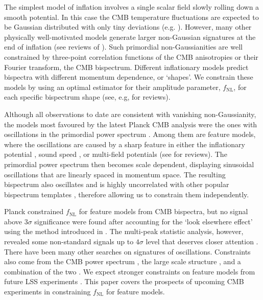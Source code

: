 The simplest model of inflation involves a single scalar field slowly rolling down a smooth potential. In this case the CMB temperature fluctuations are expected to be Gaussian distributed with only tiny deviations (e.g. \cite{Maldacena2013}). However, many other physically well-motivated models generate larger non-Gaussian signatures at the end of inflation (see reviews of \cite{Chen2010review}). Such primordial non-Gaussianities are well constrained by three-point correlation functions of the CMB anisotropies or their Fourier transform, the CMB bispectrum. Different inflationary models predict bispectra with different momentum dependence, or `shapes'. We constrain these models by using an optimal estimator for their amplitude parameter,  $f_\text{NL}$,  for each specific bispectrum shape (see, e.g, \cite{Komatsu2010,Liguori2010} for reviews).

Although all observations to date are consistent with vanishing non-Gaussianity, the models most favoured by the latest Planck CMB analysis were the ones with oscillations in the primordial power spectrum \cite{PlanckCollaboration2015}. Among them are feature models, where the oscillations are caused by a sharp feature in either the inflationary potential \cite{starobinsky1992,Adams2001,Chen2007,Adshead2012,Hazra2014,Dvorkin2010}, sound speed \cite{Miranda2012,Bartolo2013}, or multi-field potentials \cite{Achucarro2011} (see \cite{Chen2010review,Chluba2015} for reviews). The primordial power spectrum then becomes scale dependent, displaying sinusoidal oscillations that are linearly spaced in momentum space. The resulting bispectrum also oscillates and is highly uncorrelated with other popular bispectrum templates \cite{Meerburg2009}, therefore allowing us to constrain them independently.

Planck constrained $f_\text{NL}$ for feature models from CMB bispectra, but no signal above $3\sigma$ significance were found after accounting for the `look elsewhere effect' using the method introduced in \cite{Fergusson2015a}. The multi-peak statistic analysis, however, revealed some non-standard signals up to $4\sigma$ level that deserves closer attention \cite{PlanckCollaboration2015}. There have been many other searches on signatures of oscillations. Constraints also come from the CMB power spectrum \cite{Martin2004,Benetti2011,Meerburg2012,Meerburg2014a,Meerburg2014,Fergusson2015b}, the large scale structure \cite{Chantavat2011,Ballardini2016}, and a combination of the two \cite{Hu2015,Benetti2016}. We expect stronger constraints on feature models from future LSS experiments \cite{Chen2016}. This paper covers the prospects of upcoming CMB experiments in constraining $f_\text{NL}$ for feature models.

